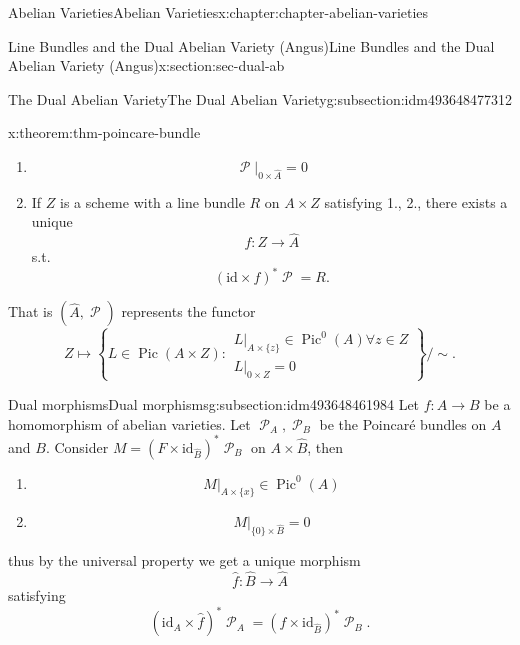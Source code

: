 \documentclass[oneside,10pt,]{book}
\numberwithin{equation}{section}
\newcommand{\sheaf}[1]{\operatorname{\mathcal{#1}}}
\newcommand{\id}{\mathrm{id}}
\DeclareMathOperator{\Pic}{Pic}
\begin{document}
\begin{chapterptx}{Abelian Varieties}{}{Abelian Varieties}{}{}{x:chapter:chapter-abelian-varieties}
\begin{sectionptx}{Line Bundles and the Dual Abelian Variety (Angus)}{}{Line Bundles and the Dual Abelian Variety (Angus)}{}{}{x:section:sec-dual-ab}
\begin{subsectionptx}{The Dual Abelian Variety}{}{The Dual Abelian Variety}{}{}{g:subsection:idm493648477312}
\begin{theorem}{}{}{x:theorem:thm-poincare-bundle}
\begin{enumerate}
%
\item{}%
\begin{equation*}
\sheaf P|_{0\times \hat A} = 0
\end{equation*}
%
\item{}If \(Z\) is a  scheme with a line bundle \(R\) on \(A\times Z\) satisfying 1., 2., there exists a unique%
\begin{equation*}
f\colon Z\to \hat A
\end{equation*}
s.t.%
\begin{equation*}
(\id\times f)^* \sheaf P = R\text{.}
\end{equation*}
%
\end{enumerate}
That is \((\hat A, \sheaf P)\)  represents the functor%
\begin{equation*}
Z \mapsto \left\{ L\in \Pic (A\times Z) : \substack{ L|_{A\times \{z\}} \in \Pic^0(A) \forall z\in Z \\L|_{ 0 \times Z } = 0}\right\}/\sim\text{.}
\end{equation*}
%
\end{theorem}
\end{subsectionptx}
%
%
\typeout{************************************************}
\typeout{************************************************}
%
\begin{subsectionptx}{Dual morphisms}{}{Dual morphisms}{}{}{g:subsection:idm493648461984}
Let \(f\colon A\to B\) be a homomorphism of abelian varieties. Let \(\sheaf P_A,\sheaf P_B\) be the Poincaré bundles on  \(A\) and \(B\). Consider \(M=    (F\times \id_{\hat B})^* \sheaf P_B\) on \(A\times \hat B\), then%
\begin{enumerate}
\item{}%
\begin{equation*}
M|_{A\times \{x\}} \in \Pic^0(A)
\end{equation*}
%
\item{}%
\begin{equation*}
M|_{\{0\} \times \hat B} = 0
\end{equation*}
%
\end{enumerate}
thus by the universal property we get a unique morphism%
\begin{equation*}
\hat f\colon \hat B \to \hat A
\end{equation*}
satisfying%
\begin{equation*}
(\id_A\times \hat f)^* \sheaf P_A = (f\times \id_{\hat B})^*\sheaf P_B\text{.}
\end{equation*}

\end{subsectionptx}
\end{sectionptx}
\end{chapterptx}
\end{document}
